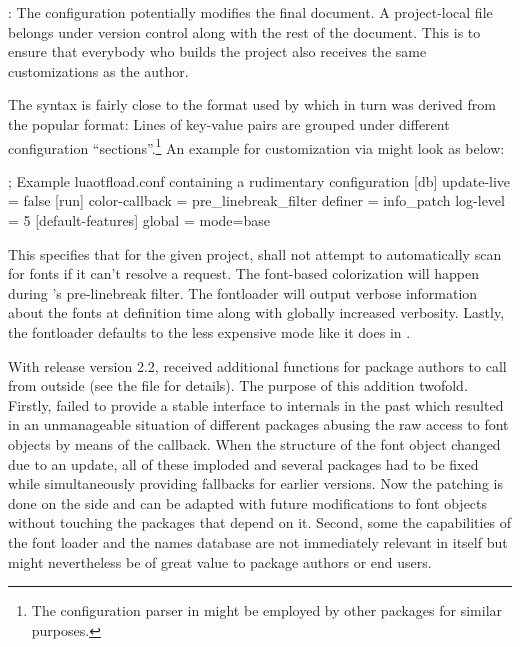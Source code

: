 \beginnarrower
  : The configuration potentially modifies the final
  document. A project-local file belongs under version control along
  with the rest of the document. This is to ensure that everybody who
  builds the project also receives the same customizations as the
  author.
\endnarrower

The syntax is fairly close to the format used by
 which in turn was derived from the popular
 format: Lines of key-value pairs are grouped under
different configuration “sections”.\footnote{%
  The configuration parser in  might
  be employed by other packages for similar purposes.
}
An example for customization via  might look
as below:

\beginlisting
; Example luaotfload.conf containing a rudimentary configuration
[db]
  update-live = false
[run]
  color-callback = pre_linebreak_filter
  definer = info_patch
  log-level = 5
[default-features]
  global = mode=base
\endlisting

This specifies that for the given project, 
shall not attempt to automatically scan for fonts if it can’t resolve a
request. The font-based colorization will happen during \LuaTeX’s
pre-linebreak filter. The fontloader will output verbose information
about the fonts at definition time along with globally increased
verbosity. Lastly, the fontloader defaults to the less expensive
 mode like it does in \ConTeXt.


With release version 2.2,  received
additional functions for package authors to call from outside
(see the file  for details).
%
The purpose of this addition twofold.
%
Firstly,  failed to provide a stable interface
to internals in the past which resulted in an unmanageable situation
of different packages abusing the raw access to font objects by means
of the  callback.
%
When the structure of the font object changed due to an update, all
of these imploded and several packages had to be fixed while
simultaneously providing fallbacks for earlier versions.
%
Now the patching is done on the  side and can
be adapted with future modifications to font objects without touching
the packages that depend on it.
%
Second, some the capabilities of the font loader and the names
database are not immediately relevant in 
itself but might nevertheless be of great value to package authors or
end users.

